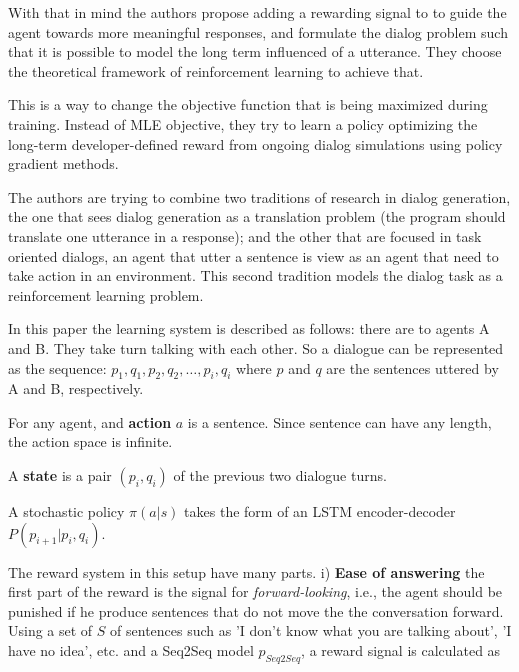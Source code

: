 With that in mind the authors propose adding a rewarding signal to to guide the agent towards more meaningful responses, and formulate the dialog problem such that it is possible to model the long term influenced of a utterance. They choose the theoretical framework of reinforcement learning to achieve that.

\par This is a way to change the objective function that is being maximized during training. Instead of MLE objective, they try to learn a policy optimizing the long-term developer-defined reward from ongoing dialog simulations using policy gradient methods.

\par The authors are trying to combine two traditions of research in dialog generation, the one that sees dialog generation as a translation problem (the program should translate one utterance in a response); and the other that are focused in task oriented dialogs, an agent that utter a sentence is view as an agent that need to take action in an environment. This second tradition models the dialog task as a reinforcement learning problem. 


\par In this paper the learning system is described as follows: there are to agents A and B. They take turn talking with each other. So a dialogue can be represented as the sequence: $p_1, q_1, p_2, q_2, \dots, p_i, q_i$ where $p$ and $q$ are the sentences uttered by A and B, respectively.

\par For any agent, and \textbf{action} $a$ is a sentence. Since sentence can have any length, the action space is infinite.

\par A \textbf{state} is a pair $(p_i, q_i)$ of the previous two dialogue turns.

\par A stochastic policy $\pi(a|s)$ takes the form of an LSTM encoder-decoder $P(p_{i+1}|p_i, q_i)$.

\par The reward system in this setup have many parts. i) \textbf{Ease of answering}  the first part of the reward is the signal for \textit{forward-looking}, i.e., the agent should be punished if he produce sentences that do not move the the conversation forward. Using a set of $S$ of sentences such as 'I don't know what you are talking about', 'I have no idea', etc. and a Seq2Seq model $p_{Seq2Seq}$, a reward signal is calculated as

